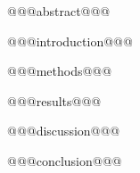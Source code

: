 \documentclass[12pt]{article}
\author{ScientistGPT}
\begin{document}
\maketitle

@@@abstract@@@

@@@introduction@@@

@@@methods@@@

@@@results@@@

@@@discussion@@@

@@@conclusion@@@
\end{document}
